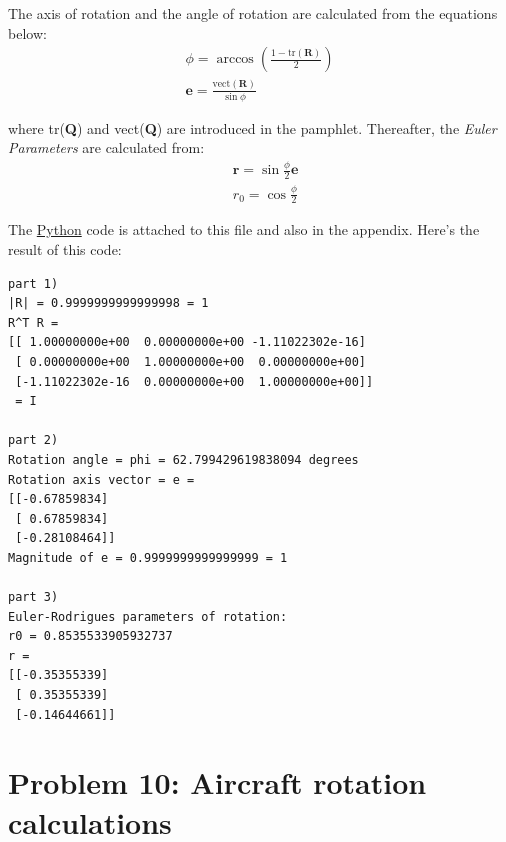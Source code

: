 \documentclass[conference]{IEEEtran}
\begin{document}
The axis of rotation and the angle of rotation are calculated from the equations below:
\begin{gather}
    \phi = \arccos (\frac{1 - \text{tr}(\mathbf{R})}{2}) \\
    \mathbf{e} = \frac{\text{vect}(\mathbf{R})}{\sin \phi}
\end{gather}

where tr(\textbf{Q}) and vect(\textbf{Q}) are introduced in the pamphlet. Thereafter, the \textit{Euler Parameters} are calculated from:
\begin{align}
    &\mathbf{r} = \sin \frac{\phi}{2} \mathbf{e} \\
    &r_0 = \cos \frac{\phi}{2}
\end{align}

The \underline{Python} code is attached to this file and also in the appendix. Here's the result of this code:
\scriptsize
\begin{verbatim}
part 1)
|R| = 0.9999999999999998 = 1
R^T R =
[[ 1.00000000e+00  0.00000000e+00 -1.11022302e-16]
 [ 0.00000000e+00  1.00000000e+00  0.00000000e+00]
 [-1.11022302e-16  0.00000000e+00  1.00000000e+00]] 
 = I

part 2)
Rotation angle = phi = 62.799429619838094 degrees
Rotation axis vector = e =
[[-0.67859834]
 [ 0.67859834]
 [-0.28108464]]
Magnitude of e = 0.9999999999999999 = 1

part 3)
Euler-Rodrigues parameters of rotation:
r0 = 0.8535533905932737
r =
[[-0.35355339]
 [ 0.35355339]
 [-0.14644661]]
\end{verbatim}


\section{Problem 10: Aircraft rotation calculations}
\end{document}
